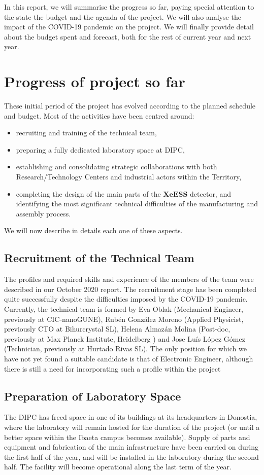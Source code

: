 \documentclass[12pt,a4paper,article]{report} %
\begin{document}
In this report, we will summarise the progress so far, paying special attention to the state the budget and the  agenda of the project. We will also analyse the impact of the COVID-19 pandemic on the project. We will finally provide detail about the budget spent and forecast, both for the rest of current year and next year. 


\newpage
\section*{Progress of project so far}


These initial period of the project has evolved according to the planned schedule and budget. Most of the activities have been centred around:
\begin{itemize} 
\item recruiting and training of the technical team,
\item preparing a fully dedicated laboratory space at DIPC,
\item establishing and consolidating strategic collaborations with both  Research/Technology Centers and industrial actors within the Territory,
\item completing the design of the main parts of the $\mathbf{XeESS}$  detector, and identifying the most significant technical difficulties of the manufacturing and assembly process. 
\end{itemize}
We will now describe in details each one of these aspects.
\subsection*{Recruitment of the Technical Team}

The profiles and required skills and experience of the members of the team were described in our October 2020 report.
The recruitment stage has been completed quite successfully despite the difficulties imposed by the COVID-19 pandemic. Currently, the technical team is formed by Eva Oblak (Mechanical Engineer, previously at CIC-nanoGUNE), Rubén González Moreno (Applied Physicist, previously CTO at Bihurcrystal SL), Helena Almazán Molina (Post-doc, previously at Max Planck Institute, Heidelberg ) and Jose Luís López Gómez (Technician, previously at Hurtado Rivas SL).  The only position for which we have not yet found a suitable candidate is that of Electronic Engineer, although there is still a need for incorporating such a profile within the project
 
\subsection*{Preparation of Laboratory Space}
The DIPC has freed space in one of its buildings at its headquarters in Donostia, where the laboratory will remain hosted for the duration of the project (or until a better space within the Ibaeta campus becomes available). Supply of parts and equipment and fabrication of the main infrastructure have been carried on during the first half of the year, and will be installed in the laboratory during the second half. The facility will become operational along the last term of the year.
\end{document}
